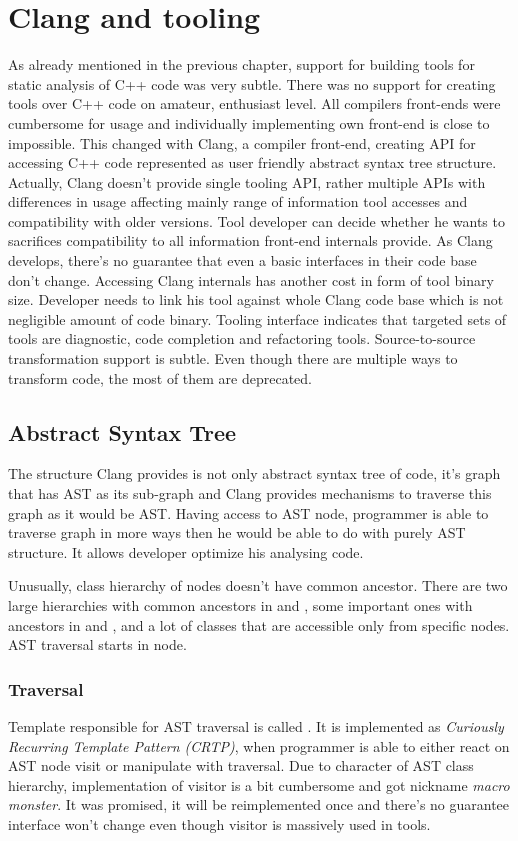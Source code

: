\chapter{Clang and tooling}
As already mentioned in the previous chapter, support for building tools for static analysis of C++ code was very subtle. There was no support for creating tools over C++ code on amateur, enthusiast level. All compilers front-ends were cumbersome for usage and individually implementing own front-end is close to impossible. This changed with Clang, a compiler front-end, creating API for accessing C++ code represented as user friendly abstract syntax tree structure. Actually, Clang doesn't provide single tooling API, rather multiple APIs with differences in usage affecting mainly range of information tool accesses and compatibility with older versions. Tool developer can decide whether he wants to sacrifices compatibility to all information front-end internals provide. As Clang develops, there's no guarantee that even a basic interfaces in their code base don't change. Accessing Clang internals has another cost in form of tool binary size. Developer needs to link his tool against whole Clang code base which is not negligible amount of code binary. Tooling interface indicates that targeted sets of tools are diagnostic, code completion and refactoring tools. Source-to-source transformation support is subtle. Even though there are multiple ways to transform code, the most of them are deprecated.

\section{Abstract Syntax Tree}
The structure Clang provides is not only abstract syntax tree of code, it's graph that has AST as its sub-graph and Clang provides mechanisms to traverse this graph as it would be AST. Having access to AST node, programmer is able to traverse graph in more ways then he would be able to do with purely AST structure. It allows developer optimize his analysing code.

Unusually, class hierarchy of nodes doesn't have common ancestor. There are two large hierarchies with common ancestors in  and , some important ones with ancestors in  and , and a lot of classes that are accessible only from specific nodes. AST traversal starts in  node. 

\subsection{Traversal}
Template responsible for AST traversal is called . It is implemented as \emph{Curiously Recurring Template Pattern (CRTP)}, when programmer is able to either react on AST node visit or manipulate with traversal. Due to character of AST class hierarchy, implementation of visitor is a bit cumbersome and got nickname \emph{macro monster}. It was promised, it will be reimplemented once and there's no guarantee interface won't change even though visitor is massively used in tools.

